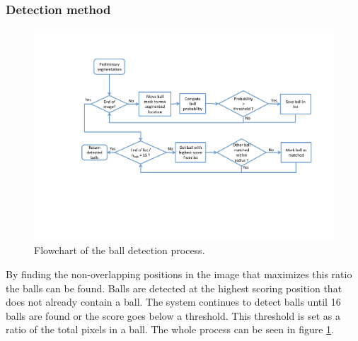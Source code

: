 \subsubsection{Detection method}
\begin{figure}[h]
\begin{center}
\includegraphics[width=\textwidth]{images/ballflowchart.pdf}
\caption{Flowchart of the ball detection process.}
\label{fig:ballflowchart}
\end{center}
\end{figure}
By finding the non-overlapping positions in the image that maximizes this ratio the balls can be found. Balls are detected at the highest scoring position that does not already contain a ball. The system continues to detect balls until 16 balls are found or the score goes below a threshold. This threshold is set as a ratio of the total pixels in a ball. The whole process can be seen in figure \ref{fig:ballflowchart}.


